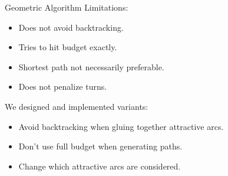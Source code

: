 \documentclass{beamer}
\begin{document}
\begin{frame}{Geometric Algorithm \cite{lu2015arc}}
    Limitations:
    \begin{itemize}
        \item Does not avoid backtracking.
        \item Tries to hit budget exactly.
        \item Shortest path not necessarily preferable.
        \item Does not penalize turns. 
    \end{itemize}
    \vspace{0.3cm}
    We designed and implemented variants:
    \begin{itemize}
        \item Avoid backtracking when gluing together attractive arcs.
        \item Don't use full budget when generating paths.
        \item Change which attractive arcs are considered.
    \end{itemize}
    
\end{frame}

%
%
\end{document}
